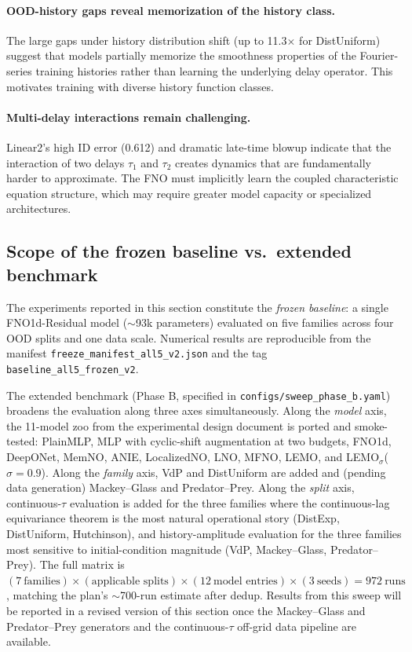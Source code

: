 \paragraph{OOD-history gaps reveal memorization of the history class.}
The large gaps under history distribution shift (up to 11.3$\times$ for DistUniform)
suggest that models partially memorize the smoothness properties of the Fourier-series
training histories rather than learning the underlying delay operator.  This motivates
training with diverse history function classes.

\paragraph{Multi-delay interactions remain challenging.}
Linear2's high ID error (0.612) and dramatic late-time blowup indicate that
the interaction of two delays $\tau_1$ and $\tau_2$ creates dynamics that are
fundamentally harder to approximate.  The FNO must implicitly learn the coupled
characteristic equation structure, which may require greater model capacity or
specialized architectures.

\subsection{Scope of the frozen baseline vs.\ extended benchmark}
\label{sec:scope-frozen-vs-phase-b}

The experiments reported in this section constitute the \emph{frozen
baseline}: a single FNO1d-Residual model ($\sim$93k parameters)
evaluated on five families across four OOD splits and one data scale.
Numerical results are reproducible from the manifest
\texttt{freeze\_manifest\_all5\_v2.json} and the tag
\texttt{baseline\_all5\_frozen\_v2}.

The extended benchmark (Phase B, specified in
\texttt{configs/sweep\_phase\_b.yaml}) broadens the evaluation along
three axes simultaneously.  Along the \emph{model} axis, the
11-model zoo from the experimental design document is ported and
smoke-tested: PlainMLP, MLP with cyclic-shift augmentation at two
budgets, FNO1d, DeepONet, MemNO, ANIE, LocalizedNO, LNO, MFNO, LEMO,
and LEMO$_{\sigma}$($\sigma = 0.9$).  Along the \emph{family} axis,
VdP and DistUniform are added and (pending data generation)
Mackey--Glass and Predator--Prey.  Along the \emph{split} axis,
continuous-$\tau$ evaluation is added for the three families where the
continuous-lag equivariance theorem is the most natural operational
story (DistExp, DistUniform, Hutchinson), and history-amplitude
evaluation for the three families most sensitive to initial-condition
magnitude (VdP, Mackey--Glass, Predator--Prey).  The full matrix is
$(7~\text{families}) \times (\text{applicable splits}) \times (12~\text{model entries}) \times (3~\text{seeds})
= 972~\text{runs}$, matching the plan's $\sim$700-run estimate after
dedup.  Results from this sweep will be reported in a revised version
of this section once the Mackey--Glass and Predator--Prey generators
and the continuous-$\tau$ off-grid data pipeline are available.
